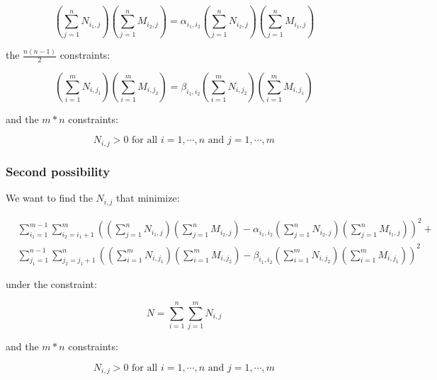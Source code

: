 \begin{equation*}
\left( \sum_{j = 1}^n N_{i_1,j} \right) \left( \sum_{j = 1}^n M_{i_2,j} \right) = \alpha_{i_1,i_2} \left( \sum_{j = 1}^n N_{i_2,j} \right) \left( \sum_{j = 1}^n M_{i_1,j} \right)
\end{equation*}

the $\frac{n \left( n - 1 \right)}{2}$ constraints:

\begin{equation*}
\left( \sum_{i = 1}^m N_{i,j_1} \right) \left( \sum_{i = 1}^m M_{i,j_2} \right) = \beta_{i_1,i_2} \left( \sum_{i = 1}^m N_{i,j_2} \right) \left( \sum_{i = 1}^m M_{i,j_1} \right)
\end{equation*}

and the $m * n$ constraints:

\begin{equation*}
N_{i,j} > 0 \text{ for all } i = 1 , \cdots , n \text{ and } j = 1 , \cdots , m
\end{equation*}

\subsubsection{Second possibility}

We want to find the $N_{i,j}$ that minimize:

\begin{align*}
&\sum_{i_1 = 1}^{m - 1} \sum_{i_2 = i_1 + 1}^m \left( \left( \sum_{j = 1}^n N_{i_1,j} \right) \left( \sum_{j = 1}^n M_{i_2,j} \right) - \alpha_{i_1,i_2} \left( \sum_{j = 1}^n N_{i_2,j} \right) \left( \sum_{j = 1}^n M_{i_1,j} \right) \right) ^2 + \\
&\sum_{j_1 = 1}^{n - 1} \sum_{j_2 = j_1 + 1}^n \left( \left( \sum_{i = 1}^m N_{i,j_1} \right) \left( \sum_{i = 1}^m M_{i,j_2} \right) - \beta_{i_1,i_2} \left( \sum_{i = 1}^m N_{i,j_2} \right) \left( \sum_{i = 1}^m M_{i,j_1} \right) \right) ^2
\end{align*}

under the constraint:

\begin{equation*}
N = \sum_{i = 1}^n \sum_{j = 1}^m N_{i,j}
\end{equation*}

and the $m * n$ constraints:

\begin{equation*}
N_{i,j} > 0 \text{ for all } i = 1 , \cdots , n \text{ and } j = 1 , \cdots , m
\end{equation*}

